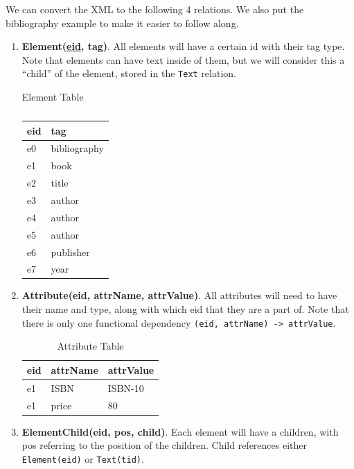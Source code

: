   We can convert the XML to the following 4 relations. We also put the bibliography example to make it easier to follow along. 
  \begin{enumerate}
    \item \textbf{Element(\underline{eid}, tag)}. All elements will have a certain id with their tag type. Note that elements can have text inside of them, but we will consider this a ``child'' of the element, stored in the \texttt{Text} relation. 

      \begin{table}[H]
        \centering
        \caption{Element Table}
        \begin{tabular}{|l|l|}
          \hline
          \textbf{eid} & \textbf{tag} \\
          \hline
          e0 & bibliography \\
          e1 & book \\
          e2 & title \\
          e3 & author \\
          e4 & author \\
          e5 & author \\
          e6 & publisher \\
          e7 & year \\
          \hline
        \end{tabular}
        \caption{}
        \label{tab:}
      \end{table}

    \item \textbf{Attribute(eid, attrName, attrValue)}. All attributes will need to have their name and type, along with which eid that they are a part of. Note that there is only one functional dependency \texttt{(eid, attrName) -> attrValue}.

      \begin{table}[H]
        \centering
        \caption{Attribute Table}
        \begin{tabular}{|l|l|l|}
        \hline
        \textbf{eid} & \textbf{attrName} & \textbf{attrValue} \\
        \hline
        e1 & ISBN & ISBN-10 \\
        e1 & price & 80 \\
        \hline
        \end{tabular}
      \end{table}

    \item \textbf{ElementChild(eid, pos, child)}. Each element will have a children, with pos referring to the position of the children. Child references either \texttt{Element(eid)} or \texttt{Text(tid)}. 


\end{enumerate}
